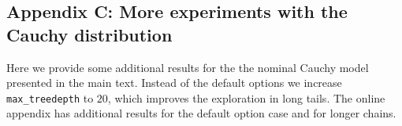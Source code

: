 \documentclass[american,]{article}
\let\oldparagraph\paragraph
\renewcommand{\paragraph}[1]{\oldparagraph{#1}\mbox{}}
\theoremstyle{definition}
\begin{document}
\hypertarget{AppendixC}{%
\subsection*{Appendix C: More experiments with the Cauchy distribution}\label{AppendixE}}

Here we provide some additional results for the the nominal Cauchy
model presented in the main text. Instead of the default options we
increase \texttt{max\_treedepth} to \(20\), which improves the
exploration in long tails. The online appendix has additional results
for the default option case and for longer chains.









\end{document}
